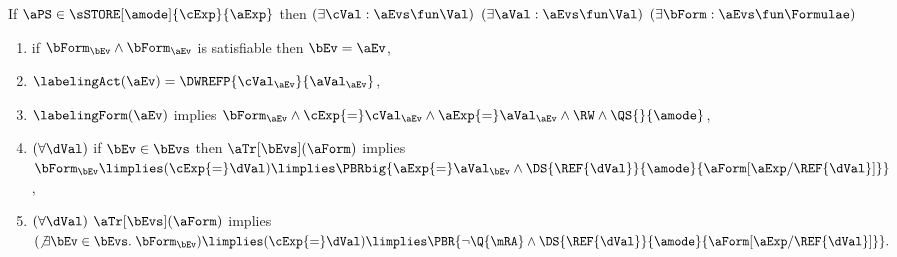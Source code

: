 \noindent
If $\aPS \in \sSTORE[\amode]{\cExp}{\aExp}$ then
$(\exists\cVal:\aEvs\fun\Val)$
$(\exists\aVal:\aEvs\fun\Val)$
$(\exists\bForm:\aEvs\fun\Formulae)$
\begin{enumerate}
\item if $\bForm_\bEv\land\bForm_\aEv$ is satisfiable then $\bEv=\aEv$,
\item $\labelingAct(\aEv) = \DWREFP{\cVal_\aEv}{\aVal_\aEv}$,
\item 
  $\labelingForm(\aEv)$ implies
  \begin{math}
    \bForm_\aEv
    \land \cExp{=}\cVal_\aEv
    \land \aExp{=}\aVal_\aEv
    \land \RW
    \land \QS{}{\amode}
  \end{math},
\item
  \begin{math}
    (\forall\dVal)
  \end{math}
  if
  $\bEv\in\bEvs$
  then
  $\aTr[\bEvs](\aForm)$ implies 
  \begin{math}
    \bForm_\bEv
    \limplies (\cExp{=}\dVal)
    \limplies \PBRbig{
      \aExp{=}\aVal_\bEv
      \land \DS{\REF{\dVal}}{\amode}{\aForm[\aExp/\REF{\dVal}]}
    }
  \end{math},
\item 
  \begin{math}
    (\forall\dVal)
  \end{math}
  $\aTr[\bEvs](\aForm)$ implies 
  \begin{math}
    (\not\exists\bEv\in\bEvs.\; \bForm_\bEv)
    \limplies (\cExp{=}\dVal)
    \limplies \PBR{
      \lnot\Q{\mRA}
      \land \DS{\REF{\dVal}}{\amode}{\aForm[\aExp/\REF{\dVal}]}
    }.
  \end{math}
\end{enumerate}

